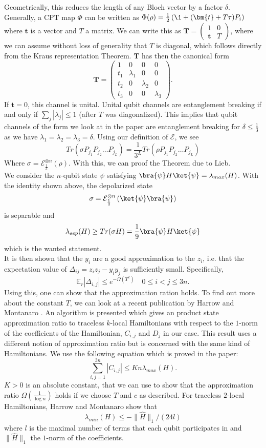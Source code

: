 Geometrically, this reduces the length of any Bloch vector by a factor $\delta$.
Generally, a CPT map $\Phi$ can be written as $\Phi(\rho)=\frac{1}{2}\left( \1 + (\bm{t}+T\tau)P_i \right)$ where $\bm{t}$ is a vector and $T$ a matrix.\cite{ruskai03}
We can write this as $\bm{T}=\begin{pmatrix}
	1 & 0 \\
	\bm{t} & T
\end{pmatrix} $, where we can assume without loss of generality that $T$ is diagonal, which follows directly from the Kraus representation Theorem.
$\bm{T}$ has then the canonical form \[
\bm{T} = \begin{pmatrix}
	1 & 0 & 0 & 0\\
	t_1 & \lambda_1 & 0 & 0\\
	t_2 & 0 & \lambda_2 & 0 \\
	t_3 & 0 & 0 & \lambda_3
\end{pmatrix}
.\]
If $\bm{t}=0$, this channel is unital.
Unital qubit channels are entanglement breaking if and only if $\sum_{j} \left| \lambda_j \right| \le 1$ (after $T$ was diagonalized).\cite{ruskai03}
This implies that qubit channels of the form we look at in the paper are entanglement breaking for $\delta\le \frac{1}{3}$ as we have $\lambda_1=\lambda_2=\lambda_3=\delta$.
Using our definition of $\mathcal{E}$, we see \[
	Tr\left( \sigma P_{j_1}P_{j_2}\ldots P_{j_L} \right) = \frac{1}{3^L}Tr\left( \rho P_{j_1}P_{j_2}\ldots P_{j_L} \right)
\]
Where $\sigma=\mathcal{E}^{\otimes n}_{\frac{1}{3}}(\rho)$.
With this, we can proof the Theorem due to Lieb.\\
We consider the $n$-qubit state $\psi$ satisfying $\bra{\psi}H\ket{\psi}=\lambda_{max}(H)$.
With the identity shown above, the depolarized state \[
	\sigma = \mathcal{E}^{\otimes n}_{\frac{1}{3}}\left( \ket{\psi}\bra{\psi} \right)
\] is separable and \[
\lambda_{sep}(H) \ge Tr(\sigma H)=\frac{1}{9}\bra{\psi}H\ket{\psi}
\] which is the wanted statement.\\
It is then shown that the $y_i$ are a good approximation to the $z_i$, i.e. that the expectation value of $\Delta_{ij}=z_iz_j-y_iy_j$ is sufficiently small.
Specifically, \[
	\mathbb{E}_r\left| \Delta_{i,j} \right|  \le e^{-\Omega(T^2)} \quad 0\le i<j\le 3n
.\]
Using this, one can show that the approximation ration holds.
To find out more about the constant $T$, we can look at a recent publication by Harrow and Montanaro \cite{harrow17}.
An algorithm is presented which gives an product state approximation ratio to traceless $k$-local Hamiltonians with respect to the $1$-norm of the coefficients of the Hamiltonian, $C_{i,j}$ and $D_j$ in our case.
This result uses a different notion of approximation ratio but is concerned with the same kind of Hamiltonians.
We use the following equation which is proved in the paper: \[
	\sum_{i,j=1}^{3n} \left| C_{i,j} \right| \le Kn\lambda_{max}(H)
.\]
$K>0$ is an absolute constant, that we can use to show that the approximation ratio $\Omega(\frac{1}{\log{}n})$ holds if we choose $T$ and $c$ as described.
For traceless $2$-local Hamiltonians, Harrow and Montanaro show that \[
	\lambda_{min}(H)\le - \|\hat{H}\|_1/(24l)
\]
where $l$ is the maximal number of terms that each qubit participates in and $\|\hat{H}\|_1$ the $1$-norm of the coefficients.
